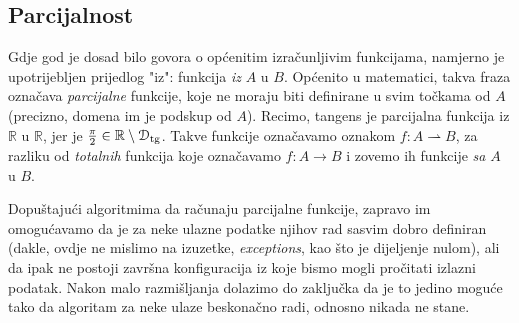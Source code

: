 \subsection{Parcijalnost}

Gdje god je dosad bilo govora o općenitim izračunljivim funkcijama, namjerno je upotrijebljen prijedlog "iz": funkcija \emph{iz} $A$ u $B$. Općenito u matematici, takva fraza označava \emph{parcijalne} funkcije, koje ne moraju biti definirane u svim točkama od $A$ (precizno, domena im je podskup od $A$). Recimo, tangens je parcijalna funkcija iz $\mathbb R$ u $\mathbb R$, jer je $\frac{\pi}{2}\in\mathbb R\setminus \mathcal D_{\text{tg}}$. Takve funkcije označavamo oznakom $f:A\rightharpoonup B$, za razliku od \emph{totalnih} funkcija koje označavamo $f:A\to B$ i zovemo ih funkcije \emph{sa} $A$ u $B$. 

Dopuštajući algoritmima da računaju parcijalne funkcije, zapravo im omogućavamo da je za neke ulazne podatke njihov rad sasvim dobro definiran (dakle, ovdje ne mislimo na izuzetke, \emph{exceptions}, kao što je dijeljenje nulom), ali da ipak ne postoji završna konfiguracija iz koje bismo mogli pročitati izlazni podatak. Nakon malo razmišljanja dolazimo do zaključka da je to jedino moguće tako da algoritam za neke ulaze beskonačno radi, odnosno nikada ne stane.


